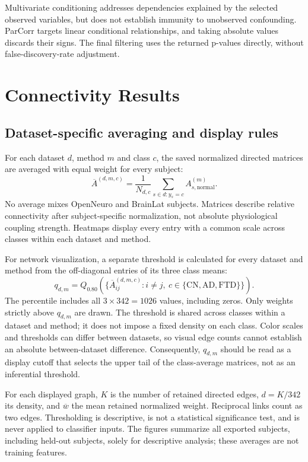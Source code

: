 \documentclass[11pt,a4paper]{article}
\begin{document}
Multivariate conditioning addresses dependencies explained by the selected
observed variables, but does not establish immunity to unobserved
confounding. ParCorr targets linear conditional relationships, and taking
absolute values discards their signs. The final filtering uses the returned
p-values directly, without false-discovery-rate adjustment.

\section{Connectivity Results}

\subsection{Dataset-specific averaging and display rules}

For each dataset $d$, method $m$ and class $c$, the saved normalized directed
matrices are averaged with equal weight for every subject:
\[
\overline A^{(d,m,c)}=\frac{1}{N_{d,c}}
\sum_{s\in d:y_s=c}A_{s,\mathrm{normal}}^{(m)}.
\]
No average mixes OpenNeuro and BrainLat subjects. Matrices describe relative
connectivity after subject-specific normalization, not absolute physiological
coupling strength. Heatmaps display every entry with a common scale across
classes within each dataset and method.

For network visualization, a separate threshold is calculated for every
dataset and method from the off-diagonal entries of its three class means:
\[
q_{d,m}=Q_{0.80}\left(\{\overline A_{ij}^{(d,m,c)}:
 i\ne j,\ c\in\{\mathrm{CN,AD,FTD}\}\}\right).
\]
The percentile includes all $3\times342=1026$ values, including zeros.
Only weights strictly above $q_{d,m}$ are drawn. The threshold is shared
across classes within a dataset and method; it does not impose a fixed density
on each class. Color scales and thresholds can differ between datasets, so
visual edge counts cannot establish an absolute between-dataset difference.
Consequently, $q_{d,m}$ should be read as a display cutoff that selects the
upper tail of the class-average matrices, not as an inferential threshold.

For each displayed graph, $K$ is the number of retained directed edges,
$d=K/342$ its density, and $\overline w$ the mean retained normalized weight.
Reciprocal links count as two edges. Thresholding is descriptive, is not a
statistical significance test, and is never applied to classifier inputs.
The figures summarize all exported subjects, including held-out subjects,
solely for descriptive analysis; these averages are not training features.
\end{document}
